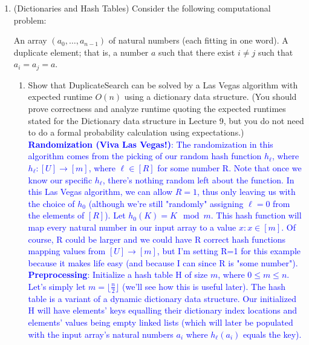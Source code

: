 \documentclass[11pt]{article}
\begin{document}
\begin{enumerate}
\begin{enumerate}
        
        
    \end{enumerate}


    \item (Dictionaries and Hash Tables) 
    Consider the following computational problem:
    
{An array $(a_0,\ldots,a_{n-1})$ of natural numbers (each fitting in one word).}
{A duplicate element; that is, a number $a$ such that there exist $i \neq j$ such that $a_i = a_j = a$.}
\begin{enumerate}
    \item Show that DuplicateSearch can be solved by a Las Vegas algorithm with expected runtime $O(n)$ using a dictionary data structure.  (You should prove correctness and analyze runtime quoting the expected runtimes stated for the Dictionary data structure in Lecture 9, but you do not need to do a formal probability calculation using expectations.)  \\

    \textcolor{blue}{
        \textbf{Randomization (Viva Las Vegas!)}:
        The randomization in this algorithm comes from the picking of our random hash function $h_{\ell}$, where $h_{\ell}: [U] \rightarrow [m]$, where $\ell \in [R]$ for some number R. Note that once we know our specific $h_{\ell}$, there's nothing random left about the function. In this Las Vegas algorithm, we can allow $R = 1$, thus only leaving us with the choice of $h_0$ (although we're still "randomly" assigning $\ell = 0$ from the elements of $[R]$). Let $h_0(K) = K \mod m$. This hash function will map every natural number in our input array to a value $x : x \in [m]$. Of course, R could be larger and we could have R correct hash functions mapping values from $[U] \rightarrow [m]$, but I'm setting R=1 for this example because it makes life easy (and because I can since R is "some number").
    } \\
    
    \textcolor{blue}{
        \textbf{Preprocessing}:
        Initialize a hash table H of size $m$, where $0 \leq m \leq n$. Let's simply let $m = \lfloor \frac{n}{2} \rfloor$ (we'll see how this is useful later). The hash table is a variant of a dynamic dictionary data structure. Our initialized H will have elements' keys equalling their dictionary index locations and elements' values being empty linked lists (which will later be populated with the input array's natural numbers $a_i$ where $h_{\ell}(a_i)$ equals the key).
    } \\


\end{enumerate}
\end{enumerate}
\end{document}
